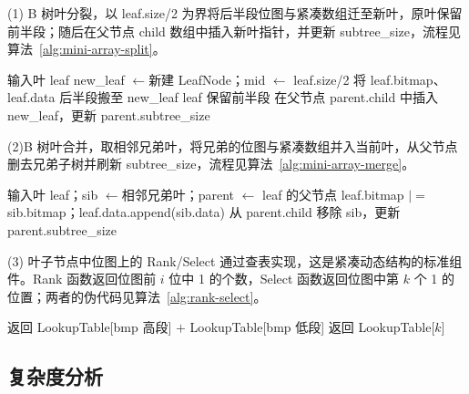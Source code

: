 (1) B 树叶分裂，以 leaf.size/2 为界将后半段位图与紧凑数组迁至新叶，原叶保留前半段；随后在父节点 child 数组中插入新叶指针，并更新 subtree\_size，流程见算法~\ref{alg:mini-array-split}。

\begin{algorithm}[htbp]
  \caption{mini-array.Split}
  \label{alg:mini-array-split}
  \begin{algorithmic}[1]
    \State 输入叶 leaf
    \State new\_leaf $\gets$新建 LeafNode；mid $\gets$ leaf.size/2
    \State 将 leaf.bitmap、leaf.data 后半段搬至 new\_leaf
    \State leaf 保留前半段
    \State 在父节点 parent.child 中插入 new\_leaf，更新 parent.subtree\_size
  \end{algorithmic}
\end{algorithm}

(2)B 树叶合并，取相邻兄弟叶，将兄弟的位图与紧凑数组并入当前叶，从父节点删去兄弟子树并刷新 subtree\_size，流程见算法~\ref{alg:mini-array-merge}。

\begin{algorithm}[htbp]
  \caption{mini-array.Merge}
  \label{alg:mini-array-merge}
  \begin{algorithmic}[1]
    \State 输入叶 leaf；sib $\gets$相邻兄弟叶；parent $\gets$ leaf 的父节点
    \State leaf.bitmap $\mathrel{|=}$ sib.bitmap；leaf.data.append(sib.data)
    \State 从 parent.child 移除 sib，更新 parent.subtree\_size
  \end{algorithmic}
\end{algorithm}

(3) 叶子节点中位图上的 Rank/Select 通过查表实现，这是紧凑动态结构的标准组件\cite{jacobson1989,pagh2008retrieval,bender2022otsh,lehmann2026mphsurvey}。Rank 函数返回位图前 \(i\) 位中 1 的个数，Select 函数返回位图中第 \(k\) 个 1 的位置；两者的伪代码见算法~\ref{alg:rank-select}。

\begin{algorithm}[htbp]
  \caption{Rank / Select（查表实现）}
  \label{alg:rank-select}
  \begin{algorithmic}[1]
      \State 返回 LookupTable[bmp 高段] $+$ LookupTable[bmp 低段]
    \EndFunction
      \State 返回 LookupTable[$k$] 
    \EndFunction
  \end{algorithmic}
\end{algorithm}

\subsection{复杂度分析}


